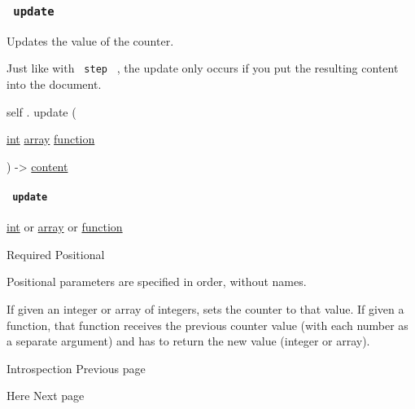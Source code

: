 \subsubsection{\texorpdfstring{\texttt{\ update\ }}{ update }}\label{definitions-update}

Updates the value of the counter.

Just like with \texttt{\ step\ } , the update only occurs if you put the
resulting content into the document.

self { . } { update } (

{ \href{/docs/reference/foundations/int/}{int}
\href{/docs/reference/foundations/array/}{array}
\href{/docs/reference/foundations/function/}{function} }

) -\textgreater{} \href{/docs/reference/foundations/content/}{content}

\paragraph{\texorpdfstring{\texttt{\ update\ }}{ update }}\label{definitions-update-update}

\href{/docs/reference/foundations/int/}{int} {or}
\href{/docs/reference/foundations/array/}{array} {or}
\href{/docs/reference/foundations/function/}{function}

{Required} {{ Positional }}

\label{definitions-update-update-positional-tooltip}
Positional parameters are specified in order, without names.

If given an integer or array of integers, sets the counter to that
value. If given a function, that function receives the previous counter
value (with each number as a separate argument) and has to return the
new value (integer or array).

\href{/docs/reference/introspection/}{\pandocbounded{}}

{ Introspection } { Previous page }

\href{/docs/reference/introspection/here/}{\pandocbounded{}}

{ Here } { Next page }
